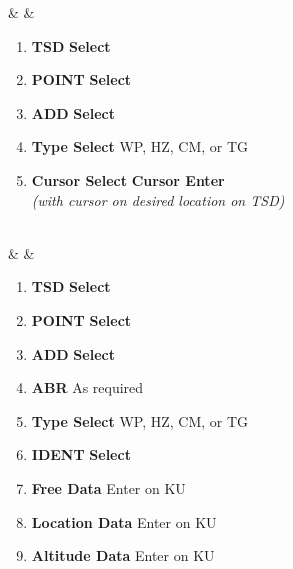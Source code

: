 \documentclass[fontInter]{TechCheck}
\begin{document}
	\begin{listlongtable}
			\textbf{\textbullet} &  &
			\begin{minipage}[t]{\linewidth}
				\vspace{-7pt}
				\begin{enumerate}
					\item \textbf{TSD} \dotfill \textbf{Select}
					\item \textbf{POINT} \dotfill \textbf{Select}
					\item \textbf{ADD} \dotfill \textbf{Select}
					\item \textbf{Type Select} \dotfill WP, HZ, CM, or TG 
					\item \textbf{Cursor Select} \dotfill \textbf{Cursor Enter} \\
					\hfill \emph{(with cursor on desired location on TSD)}
				\end{enumerate}
			\end{minipage} \\
			\midrule
			\textbf{\textbullet} &  &
			\begin{minipage}[t]{\linewidth}
				\vspace{-7pt}
				\begin{enumerate}
					\item \textbf{TSD} \dotfill \textbf{Select}
					\item \textbf{POINT} \dotfill \textbf{Select}
					\item \textbf{ADD} \dotfill \textbf{Select}
					\item \textbf{ABR} \dotfill As required
					\item \textbf{Type Select} \dotfill WP, HZ, CM, or TG 
					\item \textbf{IDENT} \dotfill \textbf{Select}
					\item \textbf{Free Data} \dotfill Enter on KU
					\item \textbf{Location Data} \dotfill Enter on KU
					\item \textbf{Altitude Data} \dotfill Enter on KU
				\end{enumerate}
			\end{minipage} \\
			\end{listlongtable}

	\clearpage
\end{document}
